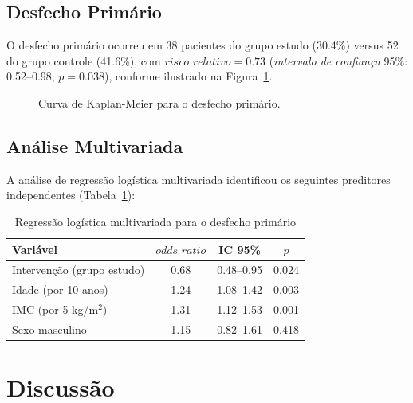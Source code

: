\documentclass[12pt,a4paper]{article}
\newcommand{\IC}{\textit{intervalo de confian\c{c}a}}
\newcommand{\OR}{\textit{odds ratio}}
\newcommand{\RR}{\textit{risco relativo}}
\begin{document}
\subsection{Desfecho Prim\'ario}

O desfecho prim\'ario ocorreu em 38 pacientes do grupo estudo
(30.4\%) versus 52 do grupo controle (41.6\%), com
$\RR = 0.73$ (\IC{} 95\%: 0.52--0.98; $p = 0.038$),
conforme ilustrado na Figura~\ref{fig:kaplan}.

\begin{figure}[htbp]
\centering
\vspace{2cm}
\begin{minipage}{0.75\textwidth}
\centering
{}
\end{minipage}
\caption{Curva de Kaplan-Meier para o desfecho prim\'ario.}
\label{fig:kaplan}
\end{figure}

\subsection{An\'alise Multivariada}

A an\'alise de regress\~ao log\'istica multivariada identificou
os seguintes preditores independentes (Tabela~\ref{tab:regressao}):

\begin{table}[htbp]
\centering
\caption{Regress\~ao log\'istica multivariada para o desfecho
         prim\'ario}
\label{tab:regressao}
\begin{tabular}{lccc}
\toprule
Vari\'avel & $\OR$ & IC 95\% & $p$ \\
\midrule
Interven\c{c}\~ao (grupo estudo) & 0.68 & 0.48--0.95 & 0.024 \\
Idade (por 10 anos) & 1.24 & 1.08--1.42 & 0.003 \\
IMC (por 5 kg/m$^2$) & 1.31 & 1.12--1.53 & 0.001 \\
Sexo masculino & 1.15 & 0.82--1.61 & 0.418 \\
\bottomrule
\end{tabular}
\end{table}

\section{Discuss\~ao}
\label{sec:discussao}
\end{document}
